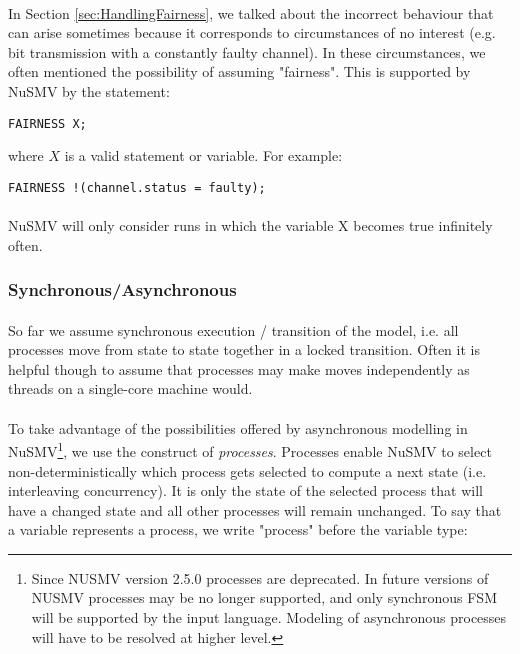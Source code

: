 \documentclass{article}
\theoremstyle{plain}
\theoremstyle{definition}
\begin{document}
\begin{multicols}{2}
\paragraph{} In Section \ref{sec:HandlingFairness}, we talked about the incorrect behaviour that can arise sometimes because it corresponds to circumstances of no interest (e.g. bit transmission with a constantly faulty channel). In these circumstances, we often mentioned the possibility of assuming "fairness". This is supported by NuSMV by the statement:

\begin{lstlisting}
FAIRNESS X;
\end{lstlisting}

where $X$ is a valid statement or variable. For example:

\begin{lstlisting}
FAIRNESS !(channel.status = faulty);
\end{lstlisting}

\paragraph{} NuSMV will only consider runs in which the variable X becomes true infinitely often.

\subsubsection{Synchronous/Asynchronous}

\paragraph{} So far we assume synchronous execution / transition of the model, i.e. all processes move from state to state together in a locked transition. Often it is helpful though to assume that processes may make moves independently as threads on a single-core machine would.

\paragraph{} To take advantage of the possibilities offered by asynchronous modelling in NuSMV\footnote{Since NUSMV version 2.5.0 processes are deprecated. In future versions of NUSMV processes
may be no longer supported, and only synchronous FSM will be supported by the input language.
Modeling of asynchronous processes will have to be resolved at higher level.}, we use the construct of \textit{processes}. Processes enable NuSMV to select non-deterministically which process gets selected to compute a next state (i.e. interleaving concurrency). It is only the state of the selected process that will have a changed state and all other processes will remain unchanged. To say that a variable represents a process, we write "process" before the variable type:


\end{multicols}
\end{document}
